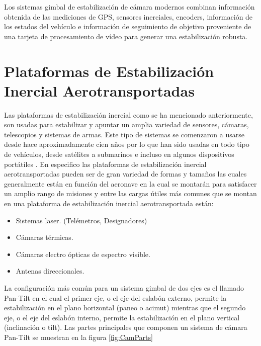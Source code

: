 Los sistemas gimbal de estabilizaci\'{o}n de c\'{a}mara modernos combinan informaci\'{o}n obtenida de las mediciones de GPS, sensores inerciales, encoders, informaci\'{o}n de los estados del veh\'{i}culo e informaci\'{o}n de seguimiento de objetivo proveniente de una tarjeta de procesamiento de v\'{i}deo para generar una estabilizaci\'{o}n robusta.  
    



\section{Plataformas de Estabilizaci\'{o}n Inercial Aerotransportadas}

Las plataformas de estabilizaci\'{o}n inercial como se ha mencionado anteriormente, son usadas para estabilizar y apuntar un amplia variedad de sensores, c\'{a}maras, telescopios y sistemas de armas. Este tipo de sistemas se comenzaron a usarse desde hace aproximadamente cien a\~{n}os por lo que han sido usadas en todo tipo de veh\'{i}culos, desde sat\'{e}lites a submarinos e incluso en algunos dispositivos port\'{a}tiles \cite{29}. En especifico las plataformas de estabilizaci\'{o}n inercial aerotransportadas pueden ser de gran variedad de formas y tama\~{n}os las cuales generalmente est\'{a}n en funci\'{o}n del aeronave en la cual se montar\'{a}n para satisfacer un amplio rango de misiones y entre las cargas \'{u}tiles m\'{a}s comunes que se montan en una plataforma de estabilizaci\'{o}n inercial aerotransportada est\'{a}n:

\begin{itemize}
    \item Sistemas laser. (Tel\'{e}metros, Designadores)
    \item C\'{a}maras t\'{e}rmicas.
    \item C\'{a}maras electro \'{o}pticas de espectro visible.
    \item Antenas direccionales.   
\end{itemize}
La configuraci\'{o}n m\'{a}s com\'{u}n para un sistema gimbal de dos ejes es el llamado Pan-Tilt en el cual el primer eje, o el eje del eslab\'{o}n externo, permite la estabilizaci\'{o}n en el plano horizontal (paneo o acimut) mientras que el segundo eje, o el eje del eslab\'{o}n interno, permite la estabilizaci\'{o}n en el plano vertical (inclinaci\'{o}n o tilt). Las partes principales que componen un sistema de c\'{a}mara Pan-Tilt se muestran en la figura \ref{fig:CamParts}

